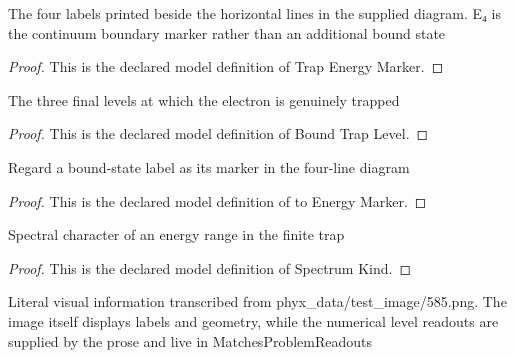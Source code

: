 \begin{definition}
  \label{def:physics:phyx-mini-0585:phyxminiproblems-problemphyxmini0585-trapenergymarker}
  The four labels printed beside the horizontal lines in the supplied diagram. E₄ is the continuum boundary marker rather than an additional bound state
\end{definition}
\begin{proof}
  This is the declared model definition of Trap Energy Marker.
\end{proof}
\begin{definition}
  \label{def:physics:phyx-mini-0585:phyxminiproblems-problemphyxmini0585-boundtraplevel}
  The three final levels at which the electron is genuinely trapped
\end{definition}
\begin{proof}
  This is the declared model definition of Bound Trap Level.
\end{proof}
\begin{definition}
  \label{def:physics:phyx-mini-0585:phyxminiproblems-problemphyxmini0585-boundtraplevel-toenergymarker}
  Regard a bound-state label as its marker in the four-line diagram
\end{definition}
\begin{proof}
  This is the declared model definition of to Energy Marker.
\end{proof}
\begin{definition}
  \label{def:physics:phyx-mini-0585:phyxminiproblems-problemphyxmini0585-spectrumkind}
  Spectral character of an energy range in the finite trap
\end{definition}
\begin{proof}
  This is the declared model definition of Spectrum Kind.
\end{proof}
\begin{definition}
  \label{def:physics:phyx-mini-0585:phyxminiproblems-problemphyxmini0585-trapenergylevelfigure}
  Literal visual information transcribed from phyx\_data/test\_image/585.png. The image itself displays labels and geometry, while the numerical level readouts are supplied by the prose and live in MatchesProblemReadouts
\end{definition}
